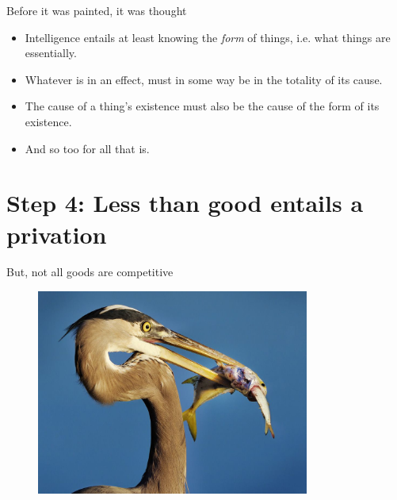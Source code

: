 \documentclass[xcolor=dvipsnames]{beamer}
\begin{document}
\begin{frame}[fragile]{Before it was painted, it was thought}
  \begin{itemize}
  \item Intelligence entails at least knowing the \emph{form} of things, i.e. what things are essentially. \vspace{5mm}
  \item Whatever is in an effect, must in some way be in the totality of its cause. \vspace{5mm}
  \item The cause of a thing's existence must also be the cause of the form of its existence. \vspace{5mm}
  \item And so too for all that is. \vspace{5mm}
  \end{itemize}
\end{frame}


\section{Step 4: Less than good entails a privation}


\begin{frame}{But, not all goods are competitive}
\begin{figure}
  \centering
  \begin{columns}
    \centering
    \includegraphics[width=0.8\textwidth]{food-chain}
  \end{columns}
\end{figure}
\end{frame}
\end{document}
